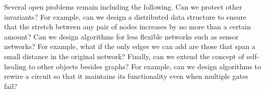 \documentclass[11pt]{article}
\begin{document}
Several open problems remain including the following.  Can we protect
other invariants?  For example, can we design a distributed data
structure to ensure that the stretch between any pair of nodes
increases by no more than a certain amount?  Can we design algorithms
for less flexible networks such as sensor networks?  For example, what
if the only edges we can add are those that span a small distance in
the original network?  Finally, can we extend the concept of
self-healing to other objects besides graphs?  For example, can we
design algorithms to rewire a circuit so that it maintains its
functionality even when multiple gates fail?



 

\end{document}
